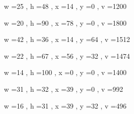 \documentclass[11pt]{article}
\begin{document}
w =25 , h =48 , x =14 , y =0 , v =1200
\par
w =20 , h =90 , x =78 , y =0 , v =1800
\par
w =42 , h =36 , x =14 , y =64 , v =1512
\par
w =22 , h =67 , x =56 , y =32 , v =1474
\par
w =14 , h =100 , x =0 , y =0 , v =1400
\par
w =31 , h =32 , x =39 , y =0 , v =992
\par
w =16 , h =31 , x =39 , y =32 , v =496
\par
\newpage
\end{document}
